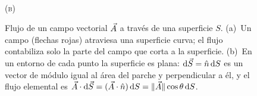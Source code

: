 \begin{figure}[ht]
\begin{minipage}[t]{0.40\textwidth}
\\[2pt]{\small\scshape (b)}
\end{minipage}
\caption{Flujo de un campo vectorial $\vec{A}$ a través de una superficie $S$.
(a)~Un campo (flechas rojas) atraviesa una superficie curva; el flujo
contabiliza solo la parte del campo que corta a la superficie. (b)~En un
entorno de cada punto la superficie es plana: $\mathrm{d}\vec{S}=\hat{n}\,\mathrm{d} S$ es un vector de
módulo igual al área del parche y perpendicular a él, y el flujo
elemental es $\vec{A}\cdot\mathrm{d}\vec{S}=(\vec{A}\cdot\hat{n})\,\mathrm{d} S=\lVert \vec{A}\rVert\cos\theta\,\mathrm{d} S$.}
\label{fig:flujo}
\end{figure}
